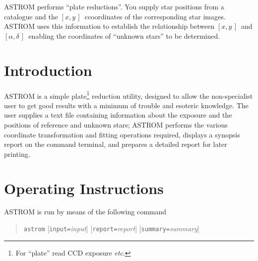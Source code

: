\documentclass[twoside,11pt]{article}
\newcommand{\stardocinitials}  {SUN}
\newcommand{\stardocnumber}    {5.18}
\newcommand{\stardocabstract}  {%
ASTROM performs ``plate reductions''.  You supply star positions from a
catalogue and the \xy\ ccoordinates of the corresponding star images.
ASTROM uses this information to establish the relationship between
\xy\ and \radec\ enabling the coordinates of ``unknown stars'' to be
determined.}
\newcommand{\stardocname}{\stardocinitials /\stardocnumber}
\newenvironment{latexonly}{}{}
\newcommand{\xlabel}[1]{}
\renewcommand{\_}{\texttt{\symbol{95}}}
\newcommand{\radec}     {$[\alpha,\delta\,]$}
\newcommand{\xy}        {$[x,y\,]$}
\renewcommand{\thepage}{\roman{page}}
\begin{document}
\stardocabstract
  \newpage
  \begin{latexonly}
    \setlength{\parskip}{0mm}
    \tableofcontents
    \setlength{\parskip}{\medskipamount}
    \markboth{\stardocname}{\stardocname}
  \end{latexonly}
\cleardoublepage
\renewcommand{\thepage}{\arabic{page}}
\setcounter{page}{1}


\section{\xlabel{introduction}Introduction}
\label{introduction}

ASTROM is a simple plate\footnote{For ``plate'' read CCD exposure
\textit{etc}.} reduction utility, designed to allow the non-specialist
user to get good results with a minimum of trouble and esoteric
knowledge.  The user supplies a text file containing information about
the exposure and the positions of reference and unknown stars;  ASTROM
performs the various coordinate transformation and fitting operations
required, displays a synopsis report on the command terminal, and
prepares a detailed report for later printing.

\section{\xlabel{operating_instructions}Operating Instructions}
\label{operating_instructions}

ASTROM is run by means of the following command
\begin{quote}
\texttt{astrom} [\texttt{input=}\textit{input}]
    [\texttt{report=}\textit{report}]
    [\texttt{summary=}\textit{summary}] \\\relax
    [\texttt{log=}\textit{log}]
    [\texttt{fits=}\textit{fits}]
    [\texttt{wcsstyle=}\textit{wcsstyle}]
\end{quote}
\end{document}
